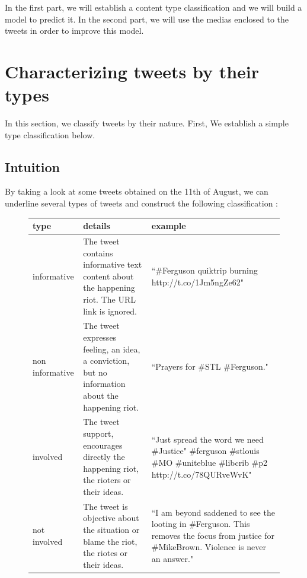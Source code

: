 \documentclass[a4paper,twoside,12pt,openright]{report}
\begin{document}
In the first part, we will establish a content type classification and we will build a model to predict it. In the second part, we will use the medias enclosed to the tweets in order to improve this model.

\newpage
\section{Characterizing tweets by their types}
In this section, we classify tweets by their nature. First, We establish a simple type classification below.

\subsection{Intuition}

\newcommand{\info}[1]{\colorbox{cyan!20}{#1}}
\newcommand{\rass}[1]{\colorbox{red!20}{#1}}
\newcommand{\ninfo}[1]{\colorbox{black!20}{#1}}
\newcommand{\nrass}[1]{\colorbox{green!20}{#1}}

By taking a look at some tweets obtained on the 11th of August, we can underline several types of tweets and construct the following classification :

\begin{figure}[h!]
\centering
\begin{tabular}{l|m{7cm}|m{6cm}}
type & details & example\\
\hline
\hline
\info{informative} & The tweet contains informative text content about the happening riot. The URL link is ignored. & ``\#Ferguson quiktrip burning http://t.co/1Jm5ngZe62" \\
\hline
\ninfo{non informative} & The tweet expresses feeling, an idea, a conviction, but no information about the happening riot. & ``Prayers for \#STL \#Ferguson." \\
\hline
\hline
\rass{involved} & The tweet support, encourages directly the happening riot, the rioters or their ideas. & ``Just spread the word we need \#Justice" \#ferguson \#stlouis \#MO  \#uniteblue \#libcrib \#p2 http://t.co/78QURveWvK" \\
\hline
\nrass{not involved} & The tweet is objective about the situation or blame the riot, the riotes or their ideas. & ``I am beyond saddened to see the looting in \#Ferguson. This removes the focus from justice for \#MikeBrown. Violence is never an answer." \\
\end{tabular}
\end{figure}
\end{document}
